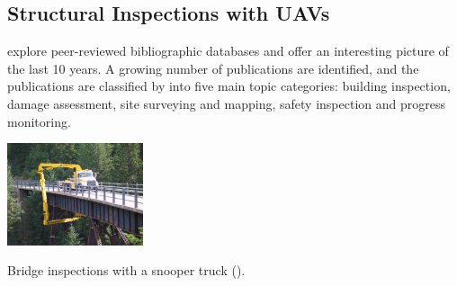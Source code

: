 \subsection{Structural Inspections with UAVs}

\cite{zhou_gheisari_2021} \hspace*{0.3cm} \textit{}
\hspace*{0.5cm} explore peer-reviewed bibliographic databases and offer an interesting picture of the last 10 years. A growing number of publications are identified, and the publications are classified by  into five main topic categories: building inspection, damage assessment, site surveying and mapping, safety inspection and progress monitoring.


\begin{marginfigure}%
  \includegraphics[width=4cm]{images/stage_sota/snooper.jpg}
  \caption{Bridge inspections with a snooper truck \cite{drone_vs_snooper_2016} ().}
  \label{fig:snooper}
\end{marginfigure}


